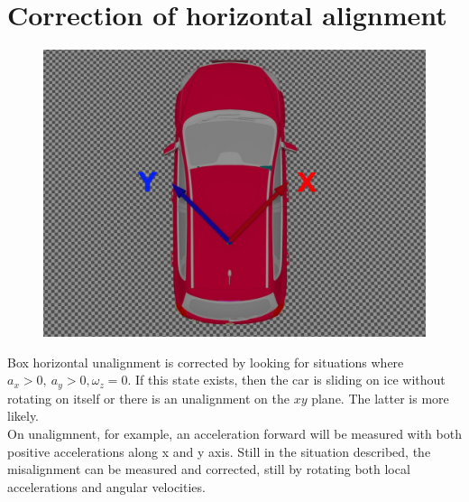 \section{Correction of horizontal alignment}
\begin{figure}[H]
\includegraphics[width=\textwidth]{kia_bad_xy_align.jpg}
\end{figure}
\justify
Box horizontal unalignment is corrected by looking for situations where $a_x>0, \ a_y>0, \omega_z =0$. If this state exists, then the car is sliding on ice without rotating on itself or there is an unalignment on the $xy$ plane. The latter is more likely.\\
On unaligmnent, for example, an acceleration forward will be measured with both positive accelerations along x and y axis. 
Still in the situation described, the misalignment can be measured and corrected, still by rotating both local accelerations and angular velocities.

